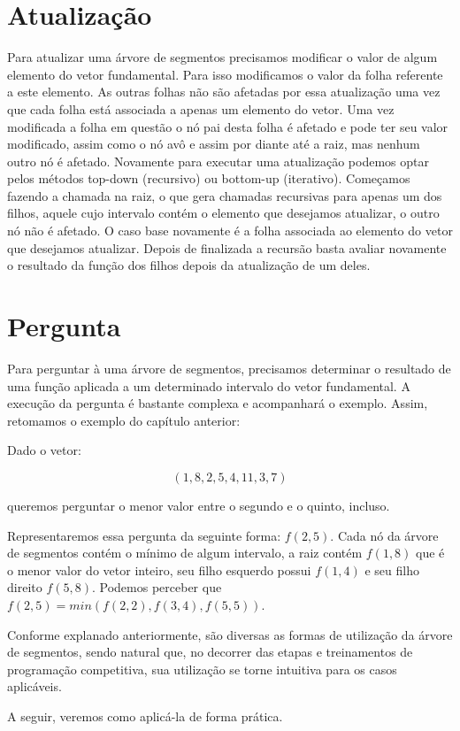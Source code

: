 \section{Atualização}

Para atualizar uma árvore de segmentos precisamos modificar o valor de algum 
elemento do vetor fundamental. Para isso modificamos o valor da folha referente 
a este elemento. As outras folhas não são afetadas por essa atualização uma vez 
que cada folha está associada a apenas um elemento do vetor. Uma vez modificada 
a folha em questão o nó pai desta folha é afetado e pode ter seu valor modificado, 
assim como o nó avô e assim por diante até a raiz, mas nenhum outro nó é afetado. 
Novamente para executar uma atualização podemos optar pelos métodos top-down 
(recursivo) ou bottom-up (iterativo). Começamos fazendo a chamada na raiz, o 
que gera chamadas recursivas para apenas um dos filhos, aquele cujo intervalo 
contém o elemento que desejamos atualizar, o outro nó não é afetado. O caso base 
novamente é a folha associada ao elemento do vetor que desejamos atualizar. Depois 
de finalizada a recursão basta avaliar novamente o resultado da função dos filhos 
depois da atualização de um deles.

\section{Pergunta}

Para perguntar à uma árvore de segmentos, precisamos determinar o resultado de 
uma função aplicada a um determinado intervalo do vetor fundamental. A execução
da pergunta é bastante complexa e acompanhará o exemplo. Assim, retomamos o 
exemplo do capítulo anterior:

Dado o vetor:

$$(1, 8, 2, 5, 4, 11, 3, 7)$$

queremos perguntar o menor valor entre o segundo e o quinto, incluso. 

Representaremos essa pergunta da seguinte forma: $f(2,5)$. Cada nó da árvore de 
segmentos contém o mínimo de algum intervalo, a raiz contém $f(1, 8)$ que é o 
menor valor do vetor inteiro, seu filho esquerdo possui $f(1, 4)$ e seu filho 
direito $f(5, 8)$. Podemos perceber que $f(2, 5) = min(f(2, 2), f(3, 4), f(5, 5))$.

Conforme explanado anteriormente, são diversas as formas de utilização da árvore de 
segmentos, sendo natural que, no decorrer das etapas e treinamentos de programação 
competitiva, sua utilização se torne intuitiva para os casos aplicáveis.

A seguir, veremos como aplicá-la de forma prática.


